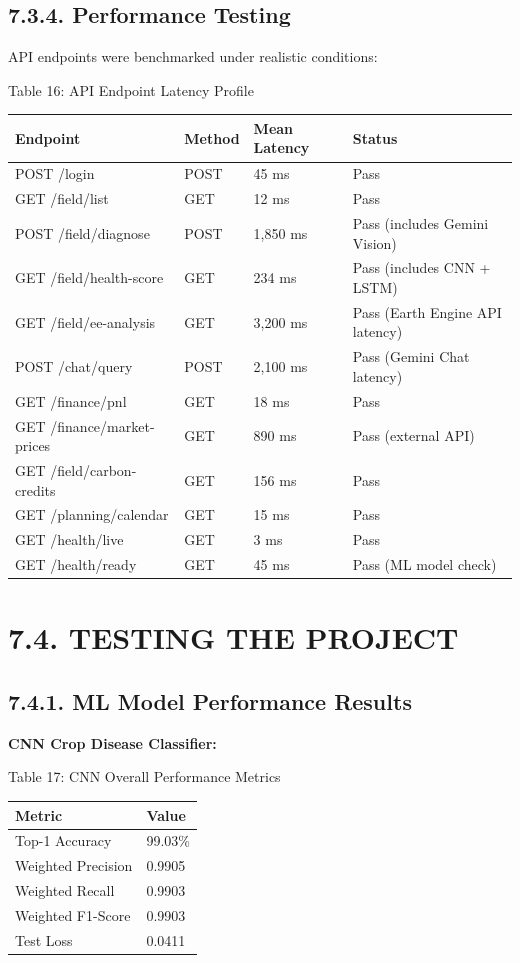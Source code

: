 \documentclass[12pt, a4paper]{report}
\begin{document}
\subsection{7.3.4. Performance Testing}
API endpoints were benchmarked under realistic conditions:

Table 16: API Endpoint Latency Profile

\begin{table}[htbp]
\centering
\small
\begin{tabularx}{\textwidth}{|X|X|X|X|}
\hline
Endpoint & Method & Mean Latency & Status \\
\hline
POST /login & POST & 45 ms & Pass \\
GET /field/list & GET & 12 ms & Pass \\
POST /field/diagnose & POST & 1,850 ms & Pass (includes Gemini Vision) \\
GET /field/health-score & GET & 234 ms & Pass (includes CNN + LSTM) \\
GET /field/ee-analysis & GET & 3,200 ms & Pass (Earth Engine API latency) \\
POST /chat/query & POST & 2,100 ms & Pass (Gemini Chat latency) \\
GET /finance/pnl & GET & 18 ms & Pass \\
GET /finance/market-prices & GET & 890 ms & Pass (external API) \\
GET /field/carbon-credits & GET & 156 ms & Pass \\
GET /planning/calendar & GET & 15 ms & Pass \\
GET /health/live & GET & 3 ms & Pass \\
GET /health/ready & GET & 45 ms & Pass (ML model check) \\
\hline
\end{tabularx}
\end{table}

\section{7.4. TESTING THE PROJECT}
\subsection{7.4.1. ML Model Performance Results}
\textbf{CNN Crop Disease Classifier:}

Table 17: CNN Overall Performance Metrics

\begin{table}[htbp]
\centering
\small
\begin{tabularx}{\textwidth}{|X|X|}
\hline
Metric & Value \\
\hline
Top-1 Accuracy & 99.03\% \\
Weighted Precision & 0.9905 \\
Weighted Recall & 0.9903 \\
Weighted F1-Score & 0.9903 \\
Test Loss & 0.0411 \\
\hline
\end{tabularx}
\end{table}
\end{document}
